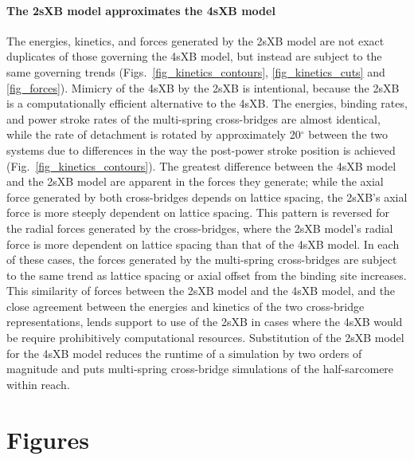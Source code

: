 \documentclass[]{article}
\begin{document}
\paragraph*{The 2sXB model approximates the 4sXB model} %
The energies, kinetics, and forces generated by the 2sXB model are not exact duplicates of those governing the 4sXB model, but instead are subject to the same governing trends (Figs.~\ref{fig_kinetics_contours}, \ref{fig_kinetics_cuts} and \ref{fig_forces}). 
Mimicry of the 4sXB by the 2sXB is intentional, because the 2sXB is a computationally efficient alternative to the 4sXB\@.  
The energies, binding rates, and power stroke rates of the multi-spring cross-bridges are almost identical, while the rate of detachment is rotated by approximately 20$^\circ$ between the two systems due to differences in the way the post-power stroke position is achieved (Fig.~\ref{fig_kinetics_contours}).
The greatest difference between the 4sXB model and the 2sXB model are apparent in the forces they generate; while the axial force generated by both cross-bridges depends on lattice spacing, the 2sXB's axial force is more steeply dependent on lattice spacing. 
This pattern is reversed for the radial forces generated by the cross-bridges, where the 2sXB model's radial force is more dependent on lattice spacing than that of the 4sXB model.  
In each of these cases, the forces generated by the multi-spring cross-bridges are subject to the same trend as lattice spacing or axial offset from the binding site increases.
This similarity of forces between the 2sXB model and the 4sXB model, and the close agreement between the energies and kinetics of the two cross-bridge representations, lends support to use of the 2sXB in cases where the 4sXB would be require prohibitively computational resources.
Substitution of the 2sXB model for the 4sXB model reduces the runtime of a simulation by two orders of magnitude and puts multi-spring cross-bridge simulations of the half-sarcomere within reach.


\clearpage
\section*{Figures} %
\end{document}
